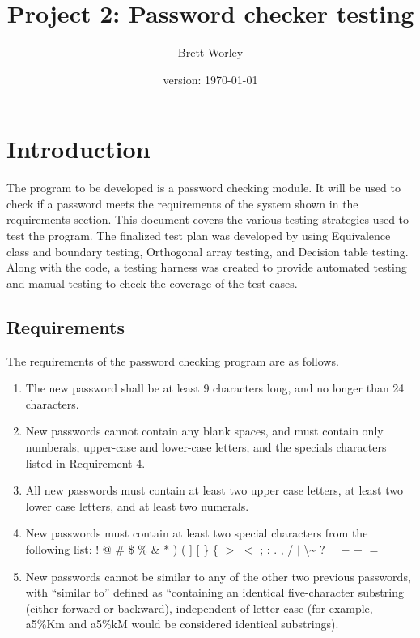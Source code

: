 \documentclass[12pt,letterpaper]{article}
\author{Brett Worley}
\title{Project 2: Password checker testing}
\date{version: \today}
\begin{document}
\maketitle
\tableofcontents



\section{Introduction}

The program to be developed is a password checking module. It will be used to check if a password
meets the requirements of the system shown in the requirements section. This document covers the 
various testing strategies used to test the program. The finalized test plan was developed by using
Equivalence class and boundary testing, Orthogonal array testing, and Decision table testing. Along
with the code, a testing harness was created to provide automated testing and manual testing to check
the coverage of the test cases.

\subsection{Requirements}

The requirements of the password checking program are as follows.

\begin{enumerate}

\item The new password shall be at least 9 characters long, and no longer than
24 characters.
\item New passwords cannot contain any blank spaces, and must contain only numberals, upper-case and lower-case letters, and
the specials characters listed in Requirement 4.
\item All new passwords must contain at least two upper case letters, at least two lower case
letters, and at least two numerals.
\item New passwords must contain at least two special characters from the following list: 
  !  @  \#  \$  \%  \&  *  )  (  ]  [  \}  \{  $>$  $<$  ; 
   :  .  ,  /  $|$   \textbackslash  \~{}  ?  \_  $-$  $+$  $=$ 

\item New passwords cannot be similar to any of the other two previous passwords, with ``similar to'' defined
as ``containing an identical five-character substring (either forward or backward), independent of letter
case (for example, a5\%Km and a5\%kM would be considered identical substrings).

\end{enumerate}
\end{document}
